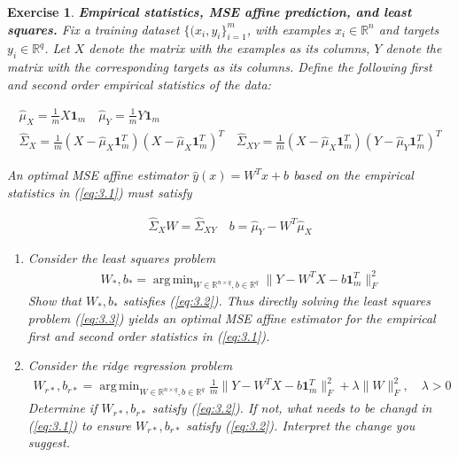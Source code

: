 \documentclass[12pt]{article}
\DeclareMathOperator*{\argmin}{arg\,min}
\theoremstyle{colon}
\newtheorem{exercise}{Exercise}
\begin{document}
\begin{exercise}
  \textbf{Empirical statistics, MSE affine prediction, and least squares.} Fix a training dataset $\{(x_i, y_i\}_{i=1}^m$, with examples $x_i \in \mathbb{R}^n$ and targets $y_i \in \mathbb{R}^q$. Let $X$ denote the matrix with the examples as its columns, $Y$ denote the matrix with the corresponding targets as its columns. Define the following first and second order empirical statistics of the data:

  \begin{gather}
    \label{eq:3.1}
    \hat{\mu}_X = \frac{1}{m} X \bm{1}_m \quad \hat{\mu}_Y = \frac{1}{m} Y \bm{1}_m \\
    \hat{\Sigma}_X = \frac{1}{m} (X - \hat{\mu}_X \bm{1}_m^T)(X - \hat{\mu}_X \bm{1}_m^T)^T \quad \hat{\Sigma}_{XY} = \frac{1}{m} (X - \hat{\mu}_X \bm{1}_m^T)(Y - \hat{\mu}_Y \bm{1}_m^T)^T \nonumber
  \end{gather}

  An optimal MSE affine estimator $\hat{y}(x) = W^T x + b$ based on the empirical statistics in (\ref{eq:3.1}) must satisfy

  \begin{gather}
    \label{eq:3.2}
    \hat{\Sigma}_X W = \hat{\Sigma}_{XY} \quad b = \hat{\mu}_Y - W^T \hat{\mu}_X
  \end{gather}

  \begin{enumerate}[label=\alph*)]
    \item Consider the least squares problem
      \begin{gather}
        \label{eq:3.3}
        W_*, b_* = \argmin_{W \in \mathbb{R}^{n \times q}, b \in \mathbb{R}^q} \lVert Y - W^T X - b \bm{1}_m^T \rVert_F^2
      \end{gather}
      Show that $W_*, b_*$ satisfies (\ref{eq:3.2}). Thus directly solving the least squares problem (\ref{eq:3.3}) yields an optimal MSE affine estimator for the empirical first and second order statistics in (\ref{eq:3.1}).

    \item Consider the ridge regression problem
      \begin{gather*}
        W_{r*}, b_{r*} = \argmin_{W \in \mathbb{R}^{n \times q}, b \in \mathbb{R}^q} \frac{1}{m} \lVert Y - W^T X - b \bm{1}_m^T \rVert_F^2 + \lambda \lVert W \rVert_F^2, \quad \lambda > 0
      \end{gather*}
      Determine if $W_{r*}, b_{r*}$ satisfy (\ref{eq:3.2}). If not, what needs to be changd in (\ref{eq:3.1}) to ensure $W_{r*}, b_{r*}$ satisfy (\ref{eq:3.2}). Interpret the change you suggest.
  \end{enumerate}
\end{exercise}
\end{document}
